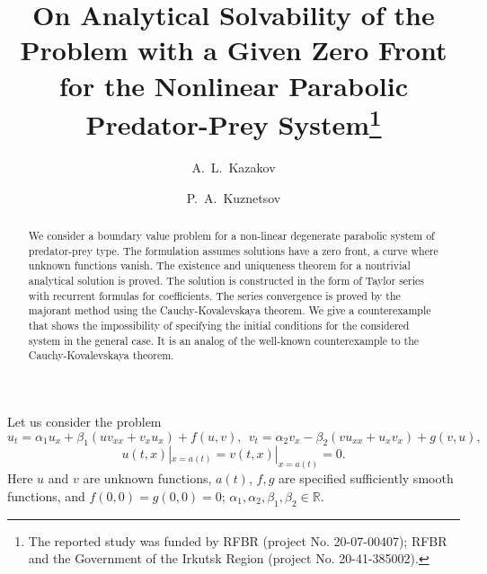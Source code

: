 \documentclass[12pt]{llncs}
\begin{document}
%
\fi

\title{On Analytical Solvability of the Problem with a Given Zero Front for the Nonlinear Parabolic Predator-Prey System\thanks{The reported study was funded by RFBR (project No. 20-07-00407); RFBR and the Government of the Irkutsk Region (project No. 20-41-385002).}}
\author{A.~L.~Kazakov 
  \and
  P.~A.~Kuznetsov 
}


\maketitle

\begin{abstract}
We consider a boundary value problem for a non-linear degenerate parabolic system of predator-prey type. The formulation assumes solutions have a zero front, a curve where unknown functions vanish. The existence and uniqueness theorem for a nontrivial analytical solution is proved. The solution is constructed in the form of Taylor series with recurrent formulas for coefficients. The series convergence  is proved by the majorant method using the Cauchy-Kovalevskaya theorem. We give a counterexample that shows the impossibility of specifying the initial conditions for the considered system in the general case. It is an analog of the well-known counterexample to the Cauchy-Kovalevskaya theorem.

\end{abstract}


Let us consider the problem
\begin{equation}\label{Kuz02}
u_t=\alpha_1u_x+\beta_1(uv_{xx}+v_xu_x)+f(u,v),~~%
v_t=\alpha_2v_x-\beta_2(vu_{xx}+u_xv_x)+g(v,u),
\end{equation}
\begin{equation}\label{Kuz03}
u(t,x)|_{x=a(t)}=v(t,x)|_{x=a(t)}=0.
\end{equation}
Here $u$ and $v$ are unknown functions, $a(t)$, $f,g$ are specified sufficiently smooth functions, and $f(0,0)=g(0,0)=0$; $\alpha_1,\alpha_2,\beta_{1},\beta_{2}\in\mathbb{R}$.
\end{document}
